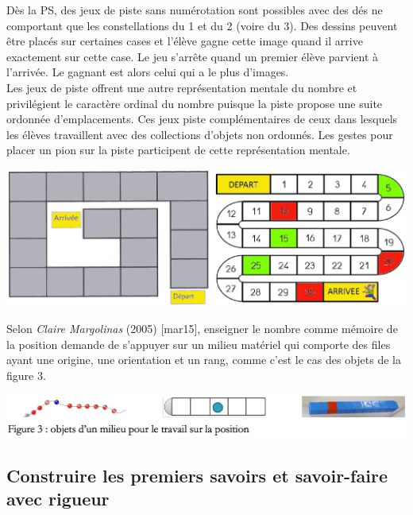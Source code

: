 Dès la PS, des jeux de piste sans numérotation sont possibles avec des dés ne comportant que les constellations du 1 et du 2 (voire du 3). Des dessins peuvent être placés sur certaines cases et l’élève gagne cette image quand il arrive exactement sur cette case. Le jeu s’arrête quand un premier élève parvient à l’arrivée. Le gagnant est alors celui qui a le plus d’images. \\
   Les jeux de piste offrent une autre représentation mentale du nombre et privilégient le caractère ordinal du nombre puisque la piste propose une suite ordonnée d’emplacements. Ces jeux  piste complémentaires de ceux dans lesquels les élèves travaillent avec des collections d'objets non ordonnés. Les gestes pour placer un pion sur la piste participent de cette représentation mentale.
   \begin{center}
       \includegraphics[width=16cm]{Nombres_et_calculs_did/Images/Num1_cours_jeux_de_l_oie}
   \end{center}  
   Selon {\it Claire Margolinas} (2005) [mar15], \og enseigner le nombre comme mémoire de la position demande de s'appuyer sur un milieu matériel qui comporte des files ayant une origine, une orientation et un rang, comme c'est le cas des objets de la figure 3. \fg
  \begin{center}
      \includegraphics[width=16cm]{Nombres_et_calculs_did/Images/Num1_cours_Margolinas}
   \end{center}

\pagebreak
 
\subsection{Construire les premiers savoirs et savoir-faire avec rigueur}

